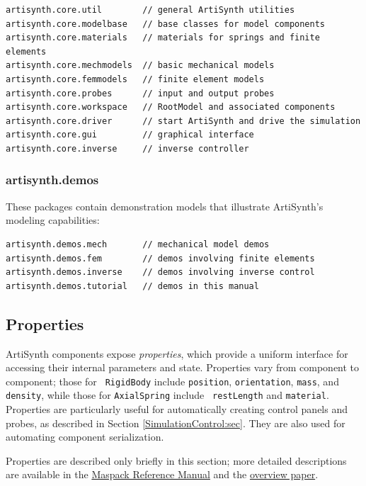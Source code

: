 \begin{lstlisting}[]
artisynth.core.util        // general ArtiSynth utilities
artisynth.core.modelbase   // base classes for model components
artisynth.core.materials   // materials for springs and finite elements
artisynth.core.mechmodels  // basic mechanical models
artisynth.core.femmodels   // finite element models
artisynth.core.probes      // input and output probes
artisynth.core.workspace   // RootModel and associated components
artisynth.core.driver      // start ArtiSynth and drive the simulation
artisynth.core.gui         // graphical interface
artisynth.core.inverse     // inverse controller
\end{lstlisting}

\subsubsection{artisynth.demos}

These packages contain demonstration models that illustrate
ArtiSynth's modeling capabilities:

\begin{lstlisting}[]
artisynth.demos.mech       // mechanical model demos
artisynth.demos.fem        // demos involving finite elements
artisynth.demos.inverse    // demos involving inverse control
artisynth.demos.tutorial   // demos in this manual
\end{lstlisting}

\subsection{Properties}
\label{Properties:sec}

ArtiSynth components expose {\it properties}, which provide a uniform
interface for accessing their internal parameters and
state. Properties vary from component to component; those for {\tt
RigidBody} include {\tt position}, {\tt orientation}, {\tt mass}, and
{\tt density}, while those for {\tt AxialSpring} include {\tt
restLength} and {\tt material}. Properties are particularly
useful for automatically creating control panels and
probes, as described in Section \ref{SimulationControl:sec}.
They are also used for automating component serialization.

Properties are described only briefly in this section; 
more detailed descriptions are available in the
\href{../maspack/maspack.html}{
Maspack Reference Manual} and the 
\href{http://www.artisynth.org/doc/artisynth.pdf}{overview
paper}.

